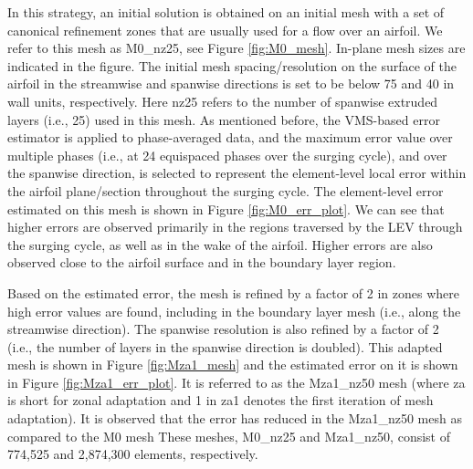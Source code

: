 In this strategy, an initial solution is obtained on an initial mesh with a set of canonical refinement zones that are usually used for a flow over an airfoil. We refer to this mesh as M0\_nz25, see Figure \ref{fig:M0_mesh}. In-plane mesh sizes are indicated in the figure. The initial mesh spacing/resolution on the surface of the airfoil in the streamwise and spanwise directions is set to be below 75 and 40 in wall units, respectively.
Here nz25 refers to the number of spanwise extruded layers (i.e., 25) used in this mesh. 
As mentioned before, the VMS-based error estimator is applied to phase-averaged data, and the maximum error value over multiple phases (i.e., at 24 equispaced phases over the surging cycle), and over the spanwise direction, is selected to represent the element-level local error within the airfoil plane/section throughout the surging cycle. 
The element-level error estimated on this mesh is shown in Figure \ref{fig:M0_err_plot}. 
We can see that higher errors are observed primarily in the regions traversed by the LEV through the surging cycle, as well as in the wake of the airfoil. 
Higher errors are also observed close to the airfoil surface and in the boundary layer region.

Based on the estimated error, the mesh is refined by a factor of 2 in zones where high error values are found, including in the boundary layer mesh (i.e., along the streamwise direction). 
The spanwise resolution is also refined by a factor of 2 (i.e., the number of layers in the spanwise direction is doubled). 
This adapted mesh is shown in Figure \ref{fig:Mza1_mesh} and the estimated error on it is shown in Figure \ref{fig:Mza1_err_plot}. It is referred to as the Mza1\_nz50 mesh (where za is short for zonal adaptation and 1 in za1 denotes the first iteration of mesh adaptation).
It is observed that the error has reduced in the Mza1\_nz50 mesh as compared to the M0 mesh
These meshes, M0\_nz25 and Mza1\_nz50, consist of 774,525 and 2,874,300 elements, respectively.


